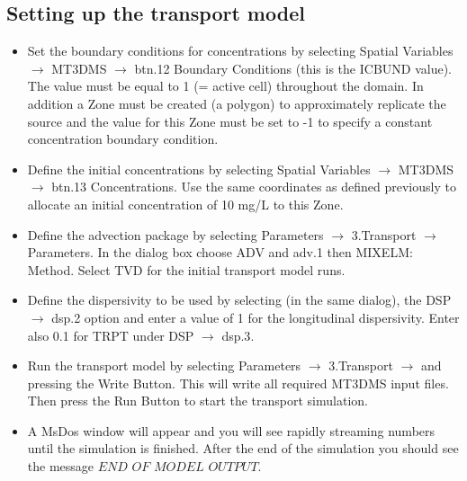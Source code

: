 \subsection{Setting up the transport model}

\begin{itemize}

\item Set the boundary conditions for concentrations by selecting 
{\color{blue}Spatial Variables} $\rightarrow$ {\color{blue}MT3DMS} 
$\rightarrow$ {\color{blue}btn.12 Boundary Conditions} (this is the ICBUND value). 
The value must be equal to 1 (= active cell) throughout the domain. In addition 
a {\color{blue}Zone} must be created (a polygon) to approximately replicate 
the source and the value for this {\color{blue}Zone} must be set to -1 
to specify a constant concentration boundary condition.

\item Define the initial concentrations by selecting 
{\color{blue}Spatial Variables} $\rightarrow$ {\color{blue}MT3DMS} 
$\rightarrow$ {\color{blue}btn.13 Concentrations}. 
Use the same coordinates as defined previously to allocate 
an initial concentration of 10 mg/L to this {\color{blue}Zone}.

\item Define the advection package by selecting 
{\color{blue}Parameters} $\rightarrow$ {\color{blue}3.Transport} $\rightarrow$ 
{\color{blue}Parameters}. In the dialog box choose {\color{blue}ADV} and  
{\color{blue}adv.1} then {\color{blue}MIXELM: Method}. 
Select {\color{blue}TVD} for the initial transport model runs.

\item Define the dispersivity to be used by selecting (in the same dialog), 
the {\color{blue}DSP} $\rightarrow$ {\color{blue}dsp.2} option and 
enter a value of 1 for the longitudinal 
dispersivity. Enter also 0.1 for TRPT under {\color{blue}DSP} $\rightarrow$ {\color{blue}dsp.3}. 

\item Run the transport model by selecting 
{\color{blue}Parameters} $\rightarrow$ 
{\color{blue}3.Transport} $\rightarrow$ and pressing the {\color{blue}Write Button}. 
This will write all required {\color{blue}MT3DMS} 
input files. Then press the {\color{blue}Run Button} to start the transport simulation.

\item A MsDos window will appear and you will see rapidly streaming numbers 
until the simulation is finished. After the end of the simulation
you should see the message $END$ $OF$ $MODEL$ $OUTPUT$. 

\end{itemize}

